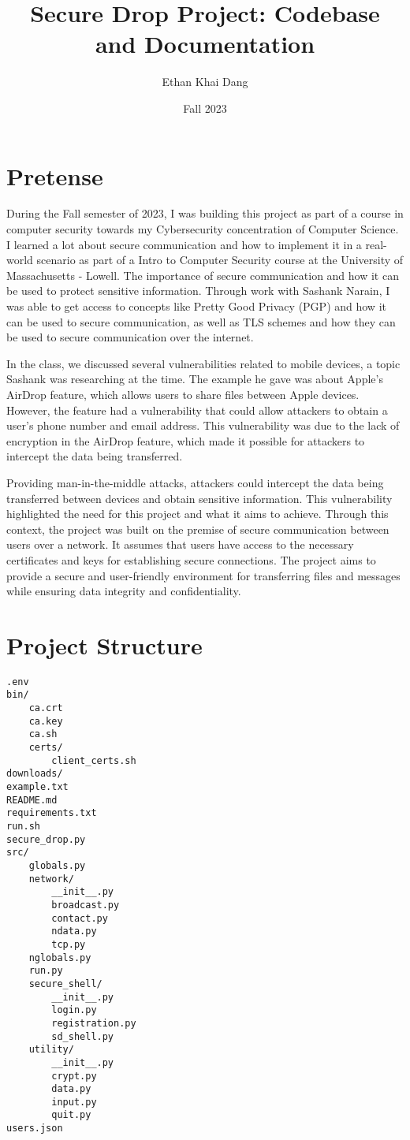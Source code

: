\documentclass[12pt]{article}
\author{Ethan Khai Dang}
\date{Fall 2023}
\title{Secure Drop Project: Codebase and Documentation}
\begin{document}
\maketitle
\tableofcontents

\newpage

\section{Pretense}
During the Fall semester of 2023, I was building this project as part of a course in computer security towards my Cybersecurity concentration of Computer Science.
I learned a lot about secure communication and how to implement it in a real-world scenario as part of a Intro to Computer Security course at the University of Massachusetts - Lowell. 
The importance of secure communication and how it can be used to protect sensitive information.
Through work with Sashank Narain, I was able to get access to concepts like Pretty Good Privacy (PGP) and how it can be used to secure communication, as well as TLS schemes and how they can be used to secure communication over the internet.

In the class, we discussed several vulnerabilities related to mobile devices, a topic Sashank was researching at the time.
The example he gave was about Apple's AirDrop feature, which allows users to share files between Apple devices. However, the feature had a vulnerability that could allow attackers to obtain a user's phone number and email address. This vulnerability was due to the lack of encryption in the AirDrop feature, which made it possible for attackers to intercept the data being transferred.

Providing man-in-the-middle attacks, attackers could intercept the data being transferred between devices and obtain sensitive information. This vulnerability highlighted the need for this project and what it aims to achieve.
Through this context, the project was built on the premise of secure communication between users over a network. It assumes that users have access to the necessary certificates and keys for establishing secure connections. The project aims to provide a secure and user-friendly environment for transferring files and messages while ensuring data integrity and confidentiality.

\newpage
\section{Project Structure}
\begin{verbatim}
.env
bin/
    ca.crt
    ca.key
    ca.sh
    certs/
        client_certs.sh
downloads/
example.txt
README.md
requirements.txt
run.sh
secure_drop.py
src/
    globals.py
    network/
        __init__.py
        broadcast.py
        contact.py
        ndata.py
        tcp.py
    nglobals.py
    run.py
    secure_shell/
        __init__.py
        login.py
        registration.py
        sd_shell.py
    utility/
        __init__.py
        crypt.py
        data.py
        input.py
        quit.py
users.json
\end{verbatim}
\end{document}
